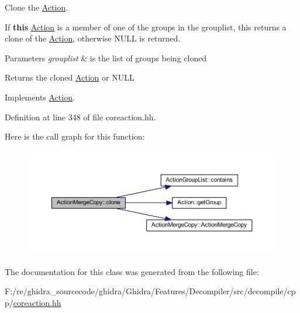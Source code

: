 Clone the \mbox{\hyperlink{class_action}{Action}}. 

If {\bfseries{this}} \mbox{\hyperlink{class_action}{Action}} is a member of one of the groups in the grouplist, this returns a clone of the \mbox{\hyperlink{class_action}{Action}}, otherwise N\+U\+LL is returned. 
\begin{DoxyParams}{Parameters}
{\em grouplist} & is the list of groups being cloned \\
\hline
\end{DoxyParams}
\begin{DoxyReturn}{Returns}
the cloned \mbox{\hyperlink{class_action}{Action}} or N\+U\+LL 
\end{DoxyReturn}


Implements \mbox{\hyperlink{class_action_af8242e41d09e5df52f97df9e65cc626f}{Action}}.



Definition at line 348 of file coreaction.\+hh.

Here is the call graph for this function\+:
\nopagebreak
\begin{figure}[H]
\begin{center}
\leavevmode
\includegraphics[width=350pt]{class_action_merge_copy_afb28234f727a499cda6e1531f348cdef_cgraph}
\end{center}
\end{figure}


The documentation for this class was generated from the following file\+:\begin{DoxyCompactItemize}
\item 
F\+:/re/ghidra\+\_\+sourcecode/ghidra/\+Ghidra/\+Features/\+Decompiler/src/decompile/cpp/\mbox{\hyperlink{coreaction_8hh}{coreaction.\+hh}}\end{DoxyCompactItemize}
